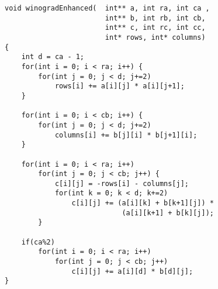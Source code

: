 \begin{lstlisting}[style=CStyle, caption={Winograd enhanced algorithm},
                    label={list:winograd}]
void winogradEnhanced(  int** a, int ra, int ca , 
                        int** b, int rb, int cb, 
                        int** c, int rc, int cc,
                        int* rows, int* columns)
{
    int d = ca - 1;
    for(int i = 0; i < ra; i++) {
        for(int j = 0; j < d; j+=2)
            rows[i] += a[i][j] * a[i][j+1];
    }

    for(int i = 0; i < cb; i++) {
        for(int j = 0; j < d; j+=2)
            columns[i] += b[j][i] * b[j+1][i];
    }

    for(int i = 0; i < ra; i++)
        for(int j = 0; j < cb; j++) {
            c[i][j] = -rows[i] - columns[j];
            for(int k = 0; k < d; k+=2)
                c[i][j] += (a[i][k] + b[k+1][j]) * 
                            (a[i][k+1] + b[k][j]);
        }

    if(ca%2)
        for(int i = 0; i < ra; i++)
            for(int j = 0; j < cb; j++)
                c[i][j] += a[i][d] * b[d][j];
}
\end{lstlisting}
